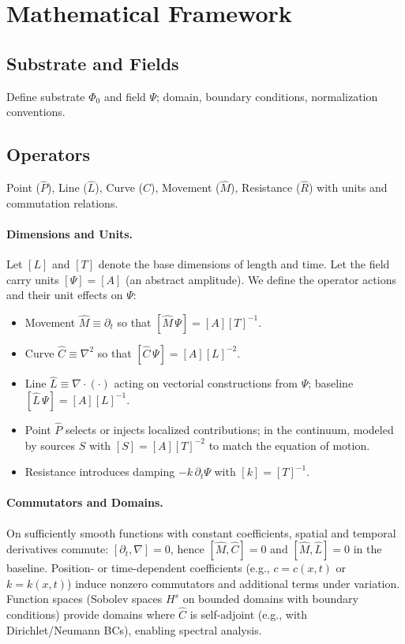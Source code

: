 \documentclass[12pt]{article}
\begin{document}
\section{Mathematical Framework}
\subsection{Substrate and Fields}
Define substrate $\Phi_0$ and field $\Psi$; domain, boundary conditions, normalization conventions.
\subsection{Operators}
Point ($\hat P$), Line ($\hat L$), Curve ($\hat C$), Movement ($\hat M$), Resistance ($\hat R$) with units and commutation relations.

\paragraph{Dimensions and Units.}
Let $[L]$ and $[T]$ denote the base dimensions of length and time. Let the field carry units $[\Psi]=[A]$ (an abstract amplitude).
We define the operator actions and their unit effects on $\Psi$:
\begin{itemize}
  \item Movement $\hat M\equiv \partial_t$ so that $[\hat M\,\Psi]=[A] [T]^{-1}$.
  \item Curve $\hat C\equiv \nabla^2$ so that $[\hat C\,\Psi]=[A] [L]^{-2}$.
  \item Line $\hat L\equiv \nabla\cdot (\cdot)$ acting on vectorial constructions from $\Psi$; baseline $[\hat L\,\Psi]=[A] [L]^{-1}$.
  \item Point $\hat P$ selects or injects localized contributions; in the continuum, modeled by sources $S$ with $[S]=[A][T]^{-2}$ to match the equation of motion.
  \item Resistance introduces damping $-k\,\partial_t\Psi$ with $[k]=[T]^{-1}$.
\end{itemize}

\paragraph{Commutators and Domains.}
On sufficiently smooth functions with constant coefficients, spatial and temporal derivatives commute: $[\partial_t,\nabla]=0$, hence $[\hat M,\hat C]=0$ and $[\hat M,\hat L]=0$ in the baseline. Position- or time-dependent coefficients (e.g., $c=c(x,t)$ or $k=k(x,t)$) induce nonzero commutators and additional terms under variation. Function spaces (Sobolev spaces $H^s$ on bounded domains with boundary conditions) provide domains where $\hat C$ is self-adjoint (e.g., with Dirichlet/Neumann BCs), enabling spectral analysis.
\end{document}
